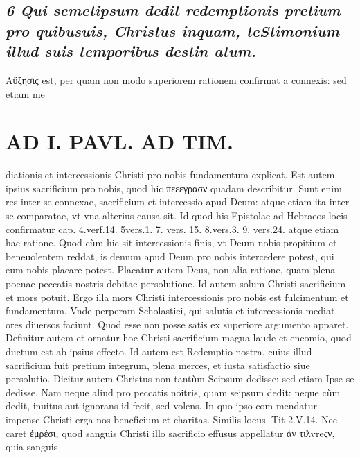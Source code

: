 \documentclass{article}
\begin{document}
\begin{pages}
\subsection*{\textit{6 Qui semetipsum dedit redemptionis pretium pro quibusuis, Christus inquam, teStimonium illud suis temporibus destin atum. }}\pstart Αὔξησις est, per quam non modo superiorem rationem confirmat a connexis: sed etiam me\pend
\section*{AD I. PAVL. AD TIM. }
\marginpar{[ p.oo ]}\pstart diationis et intercessionis Christi pro nobis fundamentum explicat. Est autem ipsius sacrificium pro nobis, quod hic πεεεγρασν quadam describitur. Sunt enim res inter se connexae, sacrificium et intercessio apud Deum: atque etiam ita inter se comparatae, vt vna alterius causa sit. Id quod his Epistolae ad Hebraeos locis confirmatur cap. 4.verf.14. 5vers.1. 7. vers. 15. 8.vers.3. 9. vers.24. atque etiam hac ratione. Quod cùm hic sit intercessionis finis, vt Deum nobis propitium et beneuolentem reddat, is demum apud Deum pro nobis intercedere potest, qui eum nobis placare potest. Placatur autem Deus, non alia ratione, quam plena poenae peccatis nostris debitae persolutione. Id autem solum Christi sacrificium et mors potuit. Ergo illa mors Christi intercessionis pro nobis est fulcimentum et fundamentum. Vnde perperam Scholastici, qui salutis et intercessionis mediat ores diuersos faciunt. Quod esse non posse satis ex superiore argumento apparet.  \pend\pstart Definitur autem et ornatur hoc Christi sacrificium magna laude et encomio, quod ductum est ab ipsius effecto. Id autem est Redemptio nostra, cuius illud sacrificium fuit pretium integrum, plena merces, et iusta satisfactio siue persolutio. Dicitur autem Christus non tantùm Seipsum dedisse: sed etiam Ipse se dedisse. Nam neque  aliud pro peccatis noitris, quam seipsum dedit: neque cùm dedit, inuitus aut ignorans id fecit, sed volens. In quo ipso com mendatur impense Christi erga nos bencficium et charitas. Similis locus. Tit 2.V.14.  \pend\pstart Nec caret ἐμρέσι, quod sanguis Christi illo sacrificio effusus appellatur ἀν τιλvreςν, quia sanguis  \pend

\end{pages}
\end{document}
